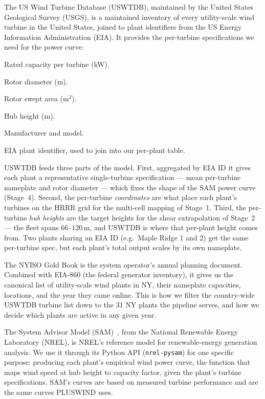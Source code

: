 \documentclass[11pt]{article}
\newcommand{\code}[1]{\texttt{\small #1}}
\begin{document}
The US Wind Turbine Database (USWTDB), maintained by the United States
Geological Survey (USGS), is a maintained inventory of every
utility-scale wind turbine in the United States, joined to plant
identifiers from the US Energy Information Administration (EIA). It
provides the per-turbine specifications we need for the power curve:
\begin{description}[leftmargin=*]
  \item[\code{t\_cap}] Rated capacity per turbine (kW).
  \item[\code{t\_rd}] Rotor diameter (m).
  \item[\code{t\_rsa}] Rotor swept area (m$^2$).
  \item[\code{t\_hh}] Hub height (m).
  \item[\code{t\_manu}, \code{t\_model}] Manufacturer and model.
  \item[\code{eia\_id}] EIA plant identifier, used to join into our
        per-plant table.
\end{description}
USWTDB feeds three parts of the model. First, aggregated by EIA ID it
gives each plant a representative single-turbine specification --- mean
per-turbine nameplate and rotor diameter --- which fixes the shape of
the SAM power curve (Stage~4). Second, the per-turbine \emph{coordinates}
are what place each plant's turbines on the HRRR grid for the multi-cell
mapping of Stage~1. Third, the per-turbine \emph{hub heights} are the
target heights for the shear extrapolation of Stage~2 --- the fleet
spans $66$--$120$\,m, and USWTDB is where that per-plant height comes
from. Two plants sharing an EIA ID (e.g.\ Maple Ridge 1 and 2) get the
same per-turbine spec, but each plant's total output scales by its own
nameplate.

The NYISO Gold Book is the system operator's annual planning document.
Combined with EIA-860
(the federal generator inventory), it gives us the canonical list of
utility-scale wind plants in NY, their nameplate capacities, locations, and
the year they came online. This is how we filter the country-wide USWTDB
turbine list down to the 31 NY plants the pipeline serves, and how we
decide which plants are active in any given year.

The System Advisor Model (SAM)~\citep{blair2018sam}, from the National
Renewable Energy Laboratory (NREL), is NREL's reference model for
renewable-energy generation analysis. We
use it through its Python API (\code{nrel-pysam}) for one specific
purpose: producing each plant's empirical wind power curve, the function
that maps wind speed at hub height to capacity factor, given the plant's
turbine specifications. SAM's curves are based on measured turbine
performance and are the same curves PLUSWIND uses.
\end{document}
